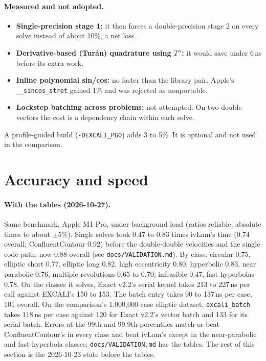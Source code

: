 \documentclass[11pt]{article}
\newcommand{\code}[1]{\texttt{#1}}
\begin{document}
\paragraph{Measured and not adopted.}
\begin{itemize}
  \item \textbf{Single-precision stage 1:} it then forces a double-precision stage 2 on every solve instead of about 10\%, a net loss.
  \item \textbf{Derivative-based (Tur\'an) quadrature using $T''$:} it would save under 6\,ns before its extra work.
  \item \textbf{Inline polynomial sin/cos:} no faster than the library pair. Apple's \code{\_\_sincos\_stret} gained 1\% and was rejected as nonportable.
  \item \textbf{Lockstep batching across problems:} not attempted. On two-double vectors the cost is a dependency chain within each solve.
\end{itemize}
A profile-guided build (\code{-DEXCALI\_PGO}) adds 3 to 5\%. It is optional and not used in the comparison.

\section{Accuracy and speed}

\paragraph{With the tables (2026-10-27).} Same benchmark, Apple M1 Pro, under background load (ratios reliable, absolute times to about $\pm5\%$). Single solves took 0.47 to 0.83 times ivLam's time (0.74 overall; ConfluentContour 0.92) before the double-double velocities and the single code path; now 0.88 overall (see \code{docs/VALIDATION.md}). By class: circular 0.75, elliptic short 0.77, elliptic long 0.82, high eccentricity 0.80, hyperbolic 0.83, near parabolic 0.76, multiple revolutions 0.65 to 0.70, infeasible 0.47, fast hyperbolas 0.78. On the classes it solves, Exact v2.2's serial kernel takes 213 to 227\,ns per call against EXCALI's 150 to 153. The batch entry takes 90 to 137\,ns per case, 101 overall. On the comparison's 1,000,000-case elliptic dataset, \code{excali\_batch} takes 118\,ns per case against 120 for Exact v2.2's vector batch and 133 for its serial batch. Errors at the 99th and 99.9th percentiles match or beat ConfluentContour's in every class and beat ivLam's except in the near-parabolic and fast-hyperbola classes; \code{docs/VALIDATION.md} has the tables. The rest of this section is the 2026-10-23 state before the tables.
\end{document}
